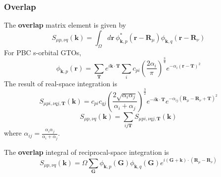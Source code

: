 \documentclass{article}
\begin{document}
        \subsubsection{Overlap}
            The \textbf{overlap} matrix element is given by
            \begin{equation}
                S_{\mu p,\nu q}(\textbf{k}) = \int_{\Omega}d\textbf{r}\ \phi_{\textbf{k},p}^*(\textbf{r}-\textbf{R}_{\mu})\phi_{\textbf{k},q}(\textbf{r}-\textbf{R}_{\nu})
            \end{equation}
            For PBC s-orbital GTOs,
            $$ \phi_{\textbf{k},p}(\textbf{r}) = \sum_{\textbf{T}}e^{i\textbf{k}\cdot\textbf{T}}\sum_ic_{pi}\left(\frac{2\alpha_i}{\pi}\right)^{\frac{3}{4}}e^{-\alpha_i(\textbf{r}-\textbf{T})^2} $$
            The result of real-space integration is   
            \begin{equation}
                S_{\mu pi,\nu qj,\textbf{T}}(\textbf{k}) = c_{pi}c_{qj}(\frac{2\sqrt{\alpha_i\alpha_j}}{\alpha_i+\alpha_j})^{\frac{3}{2}}
                e^{-i\textbf{k}\cdot\textbf{T}}e^{-\alpha_{ij}(\textbf{R}_{\mu}-\textbf{R}_{\nu}+\textbf{T})^2}
            \end{equation}
            \begin{equation}
                S_{\mu p,\nu q}(\textbf{k}) = \sum_{ij\textbf{T}}S_{\mu pi,\nu qj,\textbf{T}}(\textbf{k})
            \end{equation}
            where $\alpha_{ij} = \frac{\alpha_i\alpha_j}{\alpha_i+\alpha_j}$.

            The \textbf{overlap} integral of reciprocal-space integration is
            \begin{equation}
                S_{\mu p,\nu q}(\textbf{k}) = \Omega\sum_{\textbf{G}}\phi_{\textbf{k},p}(\textbf{G})\phi_{\textbf{k},q}(\textbf{G})e^{i(\textbf{G}+\textbf{k})\cdot(\textbf{R}_{\mu}-\textbf{R}_{\nu})}
            \end{equation}
\end{document}
